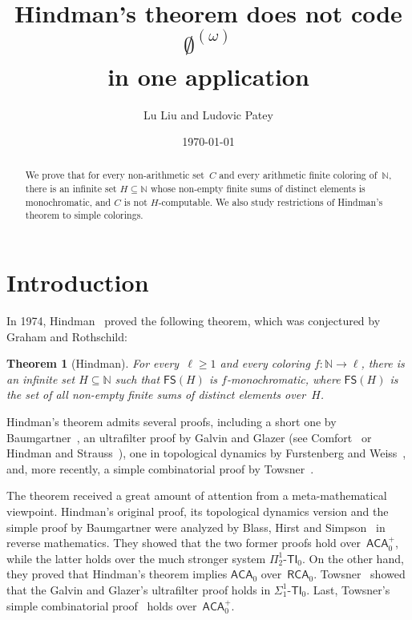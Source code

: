 \documentclass{article}
\title{Hindman's theorem does not code $\emptyset^{(\omega)}$\\ in one application}
\date{\today}
\author{Lu Liu and Ludovic Patey}
\newcommand{\RCA}[0]{\mathsf{RCA}}
\newcommand{\ACA}[0]{\mathsf{ACA}}
\newcommand{\NN}[0]{\mathbb{N}}
\newcommand{\FS}[0]{\mathsf{FS}} %
\newtheorem{theorem}{Theorem}
\numberwithin{theorem}{section}
\begin{document}
\maketitle

\begin{abstract}
We prove that for every non-arithmetic set~$C$ and every arithmetic finite coloring of~$\NN$, there is an infinite set $H \subseteq \NN$ whose non-empty finite sums of distinct elements is monochromatic, and $C$ is not $H$-computable. We also study restrictions of Hindman's theorem to simple colorings.
\end{abstract}


\section{Introduction}

In 1974, Hindman~\cite{hindmanFiniteSumsSequences1974} proved the following theorem, which was conjectured by Graham and Rothschild:

\begin{theorem}[Hindman]
For every~$\ell \geq 1$ and every coloring $f : \NN \to \ell$, there is an infinite set $H \subseteq \NN$ such that $\FS(H)$ is $f$-monochromatic, where $\FS(H)$ is the set of all non-empty finite sums of distinct elements over~$H$.
\end{theorem}

Hindman's theorem admits several proofs, including a short one by Baumgartner~\cite{baumgartnerShortProofHindmans1974}, an ultrafilter proof by Galvin and Glazer (see Comfort~\cite{comfortUltrafiltersOldNew1977} or Hindman and Strauss~\cite{hindmanAlgebraStoneCechCompactification2012}), one in topological dynamics by Furstenberg and Weiss~\cite{furstenberg1978topological}, and, more recently, a simple combinatorial proof by Towsner~\cite{towsnerSimpleProofDifficult2012}.

The theorem received a great amount of attention from a meta-mathematical viewpoint. Hindman's original proof, its topological dynamics version and the simple proof by Baumgartner were analyzed by Blass, Hirst and Simpson~\cite{blassLogicalAnalysisTheorems1987} in reverse mathematics. They showed that the two former proofs hold over~$\ACA_0^+$, while the latter holds over the much stronger system $\Pi^1_2\mbox{-}\mathsf{TI}_0$. On the other hand, they proved that Hindman's theorem implies $\ACA_0$ over~$\RCA_0$. Towsner~\cite{towsner2011hindman} showed that the Galvin and Glazer's ultrafilter proof holds in $\Sigma^1_1\mbox{-}\mathsf{TI}_0$. Last, Towsner's simple combinatorial proof~\cite{towsnerSimpleProofDifficult2012} holds over~$\ACA_0^+$. 
\end{document}
